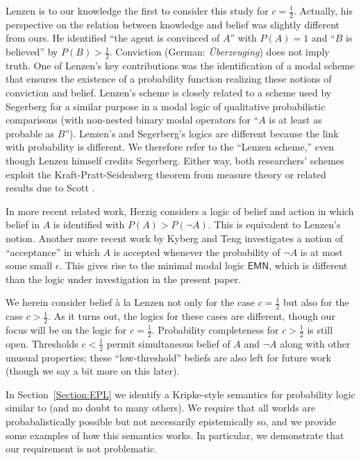 \documentclass[12pt]{article}
\theoremstyle{definition}
\begin{document}
Lenzen \cite{Lenzen2003:kbasp,Lenzen1980:gwuw} is to our knowledge the
first to consider this study for $c=\frac 12$. Actually, his
perspective on the relation between knowledge and belief was slightly
different from ours.  He identified ``the agent is convinced of $A$''
with $P(A)=1$ and ``$B$ is believed'' by $P(B)>\frac 12$. Conviction
(German: \emph{\"{U}berzeuging}) does not imply truth.  One of
Lenzen's key contributions was the identification of a modal scheme
that ensures the existence of a probability function realizing these
notions of conviction and belief.  Lenzen's scheme is closely related
to a scheme used by Segerberg \cite{Segerberg1971:qpiams} for a
similar purpose in a modal logic of qualitative probabilistic
comparisons (with non-nested binary modal operators for ``$A$ is at
least as probable as $B$'').  Lenzen's and Segerberg's logics are
different because the link with probability is different.  We
therefore refer to the ``Lenzen scheme,'' even though Lenzen himself
credits Segerberg.  Either way, both researchers' schemes exploit the
Kraft-Pratt-Seidenberg theorem from measure theory
\cite{KraPraSei59:AMS} or related results due to Scott
\cite{Sco64:JMP}.

In more recent related work, Herzig \cite{Herzig2003:mpbaa} considers
a logic of belief and action in which belief in $A$ is identified with
$P(A)>P(\lnot A)$. This is equivalent to Lenzen's notion.  Another
more recent work by Kyberg and Teng \cite{KyburgTeng2012:tlorkr}
investigates a notion of ``acceptance'' in which $A$ is accepted
whenever the probability of $\lnot A$ is at most some small
$\epsilon$.  This gives rise to the minimal modal logic
$\mathsf{EMN}$, which is different than the logic under investigation
in the present paper.

We herein consider belief \`{a} la Lenzen not only for the case
$c=\frac 12$ but also for the case $c>\frac 12$.  As it turns out, the
logics for these cases are different, though our focus will be on the
logic for $c=\frac 12$.  Probability completeness for $c>\frac 12$ is
still open.  Thresholds $c<\frac 12$ permit simultaneous belief of $A$
and $\lnot A$ along with other unusual properties; these
``low-threshold'' beliefs are also left for future work (though we say
a bit more on this later).

In Section~\ref{Section:EPL} we identify a Kripke-style semantics for
probability logic similar to
\cite{EijckSchwarzentruber2014:epls,Halpern2003:rau} (and no doubt to
many others).  We require that all worlds are probabalistically
possible but not necessarily epistemically so, and we provide some
examples of how this semantics works.  In particular, we demonstrate
that our requirement is not problematic.
\end{document}
